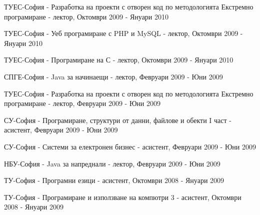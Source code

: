 \documentclass[bulgarian,a4paper]{europasscv}
\begin{document}
\begin{europasscv}
{\begin{ecvitemize}
    \item ТУЕС-София - Разработка на проекти с отворен код по методологията Екстремно програмиране - лектор, Октомври 2009 - Януари 2010
    \item ТУЕС-София - Уеб програмиране с PHP и MySQL - лектор, Октомври 2009 - Януари 2010
    \item ТУЕС-София - Програмиране на С - лектор, Октомври 2009 - Януари 2010
    \item СПГЕ-София - Java за начинаещи - лектор, Февруари 2009 - Юни 2009
    \item ТУЕС-София - Разработка на проекти с отворен код по методологията Екстремно програмиране - лектор, Февруари 2009 - Юни 2009
    \item СУ-София - Програмиране, структури от данни, файлове и обекти I част - асистент, Февруари 2009 - Юни 2009
    \item СУ-София - Системи за електронен бизнес - асистент, Февруари 2009 - Юни 2009
    \item НБУ-София - Java за напреднали - лектор, Февруари 2009 - Юни 2009
    \item ТУ-София - Програмни езици - асистент, Октомври 2008 - Януари 2009
    \item ТУ-София - Програмиране и използване на компютри 3 - асистент, Октомври 2008 - Януари 2009
  \end{ecvitemize}}
  

\end{europasscv}
\end{document}
